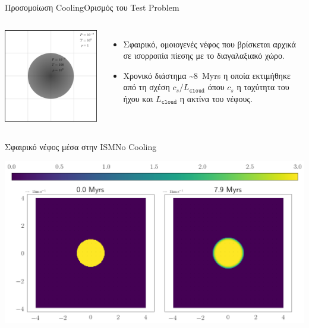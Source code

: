 \documentclass{beamer}
\begin{document}
\begin{frame}{Προσομοίωση Cooling}{Ορισμός του Test Problem}
	
\begin{columns}
	\begin{center}
		\includegraphics[width=1\linewidth]{../Document/Images/rect4578}
	\end{center}
	
	\begin{itemize}
		\item{Σφαιρικό, ομοιογενές νέφος που βρίσκεται αρχικά σε ισορροπία πίεσης με το διαγαλαξιακό χώρο.}
		\item{Χρονικό διάστημα \SI{~8}{Myrs} η οποία εκτιμήθηκε από τη σχέση $c_s/L_\mathtt{cloud}$ όπου $c_s$ η ταχύτητα του ήχου και $L_\mathtt{cloud}$ η ακτίνα του νέφους. }
	\end{itemize}
\end{columns}
\end{frame}

\begin{frame}{Σφαιρικό νέφος μέσα στην ISM}{No Cooling}
\begin{center}
	\includegraphics[width=1\linewidth]{../Document/DataImages/NoCoolingRHOquad}
\end{center}
\end{frame}
\end{document}
